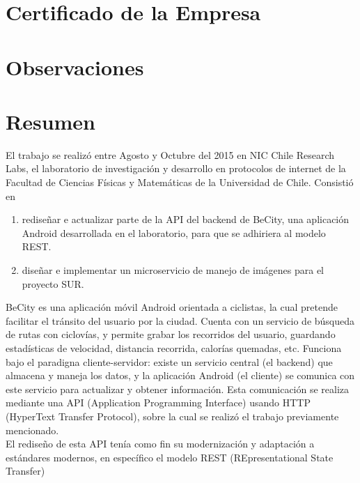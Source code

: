 \documentclass[11pt,letterpaper]{article}
\begin{document}
\renewcommand{\sectionmark}[1]{\markright{\thesection.\ #1}}
\renewcommand{\headrulewidth}{0.5pt}
\renewcommand{\footrulewidth}{0.5pt}

\newpage
\section{Certificado de la Empresa}
\newpage
\section{Observaciones}
\newpage

\tableofcontents
\listoffigures

\newpage
\section{Resumen}

El trabajo se realizó entre Agosto y Octubre del 2015 en NIC Chile Research Labs, el laboratorio de investigación y desarrollo en protocolos de internet de la Facultad de Ciencias Físicas y Matemáticas de la Universidad de Chile. \@ Consistió en
\begin{enumerate}
    \item rediseñar e actualizar parte de la API del backend de BeCity, una aplicación Android desarrollada en el laboratorio, para que se adhiriera al modelo REST.
    \item diseñar e implementar un microservicio de manejo de imágenes para el proyecto SUR.
\end{enumerate}

BeCity es una aplicación móvil Android orientada a ciclistas, la cual pretende facilitar el tránsito del usuario por la ciudad. Cuenta con un servicio de búsqueda de rutas con ciclovías, y permite grabar los recorridos del usuario, guardando estadísticas de velocidad, distancia recorrida, calorías quemadas, etc. Funciona bajo el paradigna cliente-servidor: existe un servicio central (el backend) que almacena y maneja los datos, y la aplicación Android (el cliente) se comunica con este servicio para actualizar y obtener información. Esta comunicación se realiza mediante una API (Application Programming Interface) usando HTTP (HyperText Transfer Protocol), sobre la cual se realizó el trabajo previamente mencionado.\\

El rediseño de esta API tenía como fin su modernización y adaptación a estándares modernos, en específico el modelo REST (REpresentational State Transfer)\\
\end{document}
